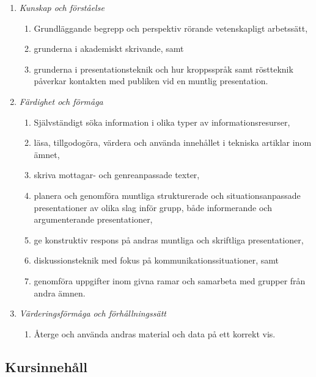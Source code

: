 \begin{enumerate}
\def\labelenumi{\Alph{enumi}.}
\tightlist
\item
  \emph{Kunskap och förståelse}

  \begin{enumerate}
  \def\labelenumii{\arabic{enumii}.}
  \tightlist
  \item
    Grundläggande begrepp och perspektiv rörande vetenskapligt
    arbetssätt,
  \item
    grunderna i akademiskt skrivande, samt
  \item
    grunderna i presentationsteknik och hur kroppsspråk samt röstteknik
    påverkar kontakten med publiken vid en muntlig presentation.
  \end{enumerate}
\item
  \emph{Färdighet och förmåga}

  \begin{enumerate}
  \def\labelenumii{\arabic{enumii}.}
  \tightlist
  \item
    Självständigt söka information i olika typer av
    informationsresurser,
  \item
    läsa, tillgodogöra, värdera och använda innehållet i tekniska
    artiklar inom ämnet,
  \item
    skriva mottagar- och genreanpassade texter,
  \item
    planera och genomföra muntliga strukturerade och situationsanpassade
    presentationer av olika slag inför grupp, både informerande och
    argumenterande presentationer,
  \item
    ge konstruktiv respons på andras muntliga och skriftliga
    presentationer,
  \item
    diskussionsteknik med fokus på kommunikationssituationer, samt
  \item
    genomföra uppgifter inom givna ramar och samarbeta med grupper från
    andra ämnen.
  \end{enumerate}
\item
  \emph{Värderingsförmåga och förhållningssätt}

  \begin{enumerate}
  \def\labelenumii{\arabic{enumii}.}
  \tightlist
  \item
    Återge och använda andras material och data på ett korrekt vis.
  \end{enumerate}
\end{enumerate}

\subsection*{Kursinnehåll}

